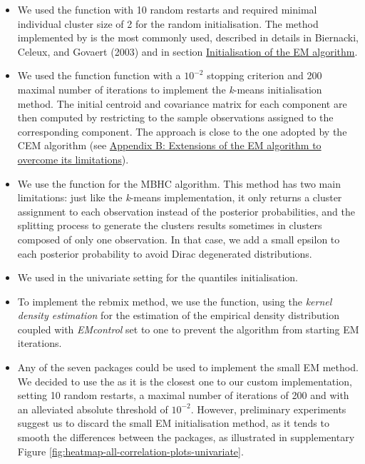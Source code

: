 \begin{itemize}
\item
  We used the function  with 10 random restarts and required minimal individual cluster size of 2 for the random initialisation. The method implemented by  is the most commonly used, described in details in Biernacki, Celeux, and Govaert (2003) and in section \protect\hyperlink{initialisation-of-the-em-algorithm}{Initialisation of the EM algorithm}.
\item
  We used the function  function with a \(10^{-2}\) stopping criterion and 200 maximal number of iterations to implement the \emph{k}-means initialisation method.
  The initial centroid and covariance matrix for each component are then computed by restricting to the sample observations assigned to the corresponding component. The approach is close to the one adopted by the CEM algorithm (see \protect\hyperlink{appendix-b-extensions-of-the-em-algorithm-to-overcome-its-limitations}{Appendix B: Extensions of the EM algorithm to overcome its limitations}).
\item
  We use the  function for the MBHC algorithm. This method has two main limitations: just like the \emph{k}-means implementation, it only returns a cluster assignment to each observation instead of the posterior probabilities, and the splitting process to generate the clusters results sometimes in clusters composed of only one observation. In that case, we add a small epsilon to each posterior probability to avoid Dirac degenerated distributions.
\item
  We used in the univariate setting  for the quantiles initialisation.
\item
  To implement the rebmix method, we use the  function, using the \emph{kernel density estimation} for the estimation of the empirical density distribution coupled with \emph{EMcontrol} set to one to prevent the algorithm from starting EM iterations.
\item
  Any of the seven packages could be used to implement the small EM method. We decided to use the  as it is the closest one to our custom implementation, setting 10 random restarts, a maximal number of iterations of 200 and with an alleviated absolute threshold of \(10^{-2}\). However, preliminary experiments suggest us to discard the small EM
  initialisation method, as it tends to smooth the differences between the packages, as illustrated in supplementary Figure \ref{fig:heatmap-all-correlation-plots-univariate}.
\end{itemize}

